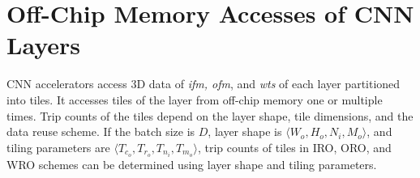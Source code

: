 \section{Off-Chip Memory Accesses of CNN Layers}\label{MemAccess_CNN}
\begin{comment}
A CNN accelerator accesses 3D data of \textit{ifm, ofm}, and \textit{wts} of each layer partitioned into tiles. It accesses tiles of the layer from off-chip memory one or multiple times. Trip counts of the tiles depend on the layer shape, tile dimensions, and the data reuse scheme. If the batch size is $D$, layer shape is $\langle W_o,H_o,N_i,M_o\rangle$ and tiling parameters are $\langle T_{c_o},T_{r_o},T_{n_i},T_{m_o}\rangle$, trip counts of tiles in IRO, ORO, and WRO schemes can be expressed as the rows of the matrix $\mathbf{R}$ in ~\eqref{eq:TripCount}, where columns represent \textit{ifm, ofm}, and \textit{wts} trip counts.
\begin{align}\label{eq:TripCount}
	\mathbf{R}=
	\begin{bmatrix}
		\mathbf{r}_{iro} \\  \mathbf{r}_{oro} \\ \mathbf{r}_{wro} \\
	\end{bmatrix}=
	\begin{bmatrix}
		D&(2\ceil[\big]{\frac{N_i}{T_{n_i}}}-1)D&\ceil[\big]{\frac{H_o}{T_{r_o}}}\ceil[\big]{\frac{W_o}{T_{c_o}}}D\\[6pt]
		\ceil[\big]{\frac{M_o}{T_{m_o}}}D&D&\ceil[\big]{\frac{H_o}{T_{r_o}}}\ceil[\big]{\frac{W_o}{T_{c_o}}} D\\[6pt]
		\ceil[\big]{\frac{M_o}{T_{m_o}}}D&(2\ceil[\big]{\frac{N_i}{T_{n_i}}}-1)D&1\\
	\end{bmatrix}
\end{align}
\end{comment}
CNN accelerators access 3D data of \textit{ifm, ofm}, and \textit{wts} of each layer partitioned into tiles. It accesses tiles of the layer from off-chip memory one or multiple times. Trip counts of the tiles depend on the layer shape, tile dimensions, and the data reuse scheme. If the batch size is $D$, layer shape is $\langle W_o,H_o,N_i,M_o\rangle$, and tiling parameters are $\langle T_{c_o},T_{r_o},T_{n_i},T_{m_o}\rangle$, trip counts of tiles in IRO, ORO, and WRO schemes can be determined using layer shape and tiling parameters. 
